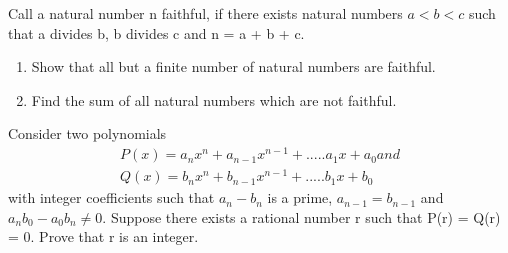 \item Call a natural number n faithful, if there exists natural numbers $a<b<c$ such that a divides b, b divides c and n = a + b + c.
\begin{enumerate}
\item Show that all but a finite number of natural numbers are faithful.
\item Find the sum of all natural numbers which are not faithful. 
\end{enumerate} 

\item Consider two polynomials 
\begin{align*}
P(x) = a_{n}x^{n} + a_{n-1}x^{n-1} + .....a_{1}x + a_{0} and\\
Q(x) = b_{n}x^{n} + b_{n-1}x^{n-1} + .....b_{1}x + b_{0}
\end{align*}
with integer coefficients such that $a_n - b_n$ is a prime, $a_{n-1} = b_{n-1}$ and $a_{n}b_{0} - a_{0}b_{n} \neq 0$. Suppose there exists a rational number r such that P(r) = Q(r) = 0. Prove that r is an integer.
















